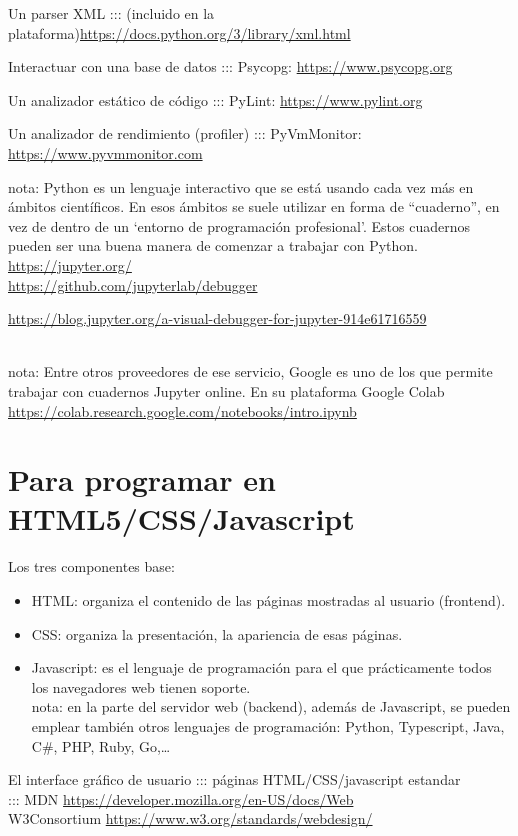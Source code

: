\documentclass[spanish,12pt,a4paper,final,oneside]{book}
\begin{document}
Un parser XML ::: (incluido en la plataforma)\url{https://docs.python.org/3/library/xml.html}

Interactuar con una base de datos ::: Psycopg: \url{https://www.psycopg.org} 

Un analizador estático de código ::: PyLint: \url{https://www.pylint.org} 

Un analizador de rendimiento (profiler) ::: PyVmMonitor: \url{https://www.pyvmmonitor.com} 

nota: Python es un lenguaje interactivo que se está usando cada vez más en ámbitos científicos. En esos ámbitos se suele utilizar en forma de ``cuaderno'', en vez de dentro de un `entorno de programación profesional'. Estos cuadernos pueden ser una buena manera de comenzar a trabajar con Python.
\\ \url{https://jupyter.org/}
\\ \url{https://github.com/jupyterlab/debugger}
\\ \begin{footnotesize}\url{https://blog.jupyter.org/a-visual-debugger-for-jupyter-914e61716559}\end{footnotesize}
\\nota: Entre otros proveedores de ese servicio, Google es uno de los que permite trabajar con cuadernos Jupyter online. En su plataforma Google Colab \url{https://colab.research.google.com/notebooks/intro.ipynb}

\section{Para programar en HTML5/CSS/Javascript}

Los tres componentes base:
\begin{itemize}
\item HTML: organiza el contenido de las páginas mostradas al usuario (frontend).
\item CSS: organiza la presentación, la apariencia de esas páginas.
\item Javascript: es el lenguaje de programación para el que prácticamente todos los navegadores web tienen soporte.
\\{\footnotesize nota: en la parte del servidor web (backend), además de Javascript, se pueden emplear también otros lenguajes de programación: Python, Typescript, Java, C\#, PHP, Ruby, Go,\ldots}
\end{itemize}

El interface gráfico de usuario ::: páginas HTML/CSS/javascript estandar
\\::: MDN \url{https://developer.mozilla.org/en-US/docs/Web}
\\W3Consortium \url{https://www.w3.org/standards/webdesign/}
\end{document}

